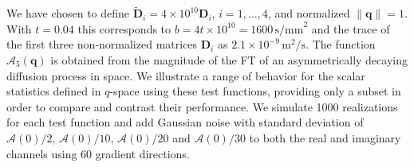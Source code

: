 \documentclass[dvips,aoas,preprint]{imsart}
\numberwithin{equation}{section}
\theoremstyle{plain}
\newcommand{\q}{\mathbf{q}}
\newcommand{\cA}{\mathcal{A}}
\newcommand{\bld}[1]{\mathbf{#1}}
\newcommand{\wt}[1]{\widetilde{#1}}
\begin{document}
We have chosen to define $\wt{\bld{D}}_i=4\times10^{10}\bld{D}_i$,
$i=1,\dots,4$, and normalized $\|\q\|=1$.  With $t=0.04$ this
corresponds to $b=4t\times10^{10}=1600\,\text{s/mm}^2$
\citep{Alexander2005} and the trace of the first three non-normalized
matrices $\bld{D}_i$ as $2.1\times10^{-9}\,\text{m$^2$/s}$.  The
function $\cA_5(\q)$ is obtained from the magnitude of the FT of an
asymmetrically decaying diffusion process in space.  We illustrate a
range of behavior for the scalar statistics defined in $q$-space using
these test functions, providing only a subset in order to compare and
contrast their performance.  We simulate 1000 realizations for each
test function and add Gaussian noise with standard deviation of
$\cA(0)/2$, $\cA(0)/10$, $\cA(0)/20$ and $\cA(0)/30$ to both the real
and imaginary channels using 60 gradient directions.
\end{document}
